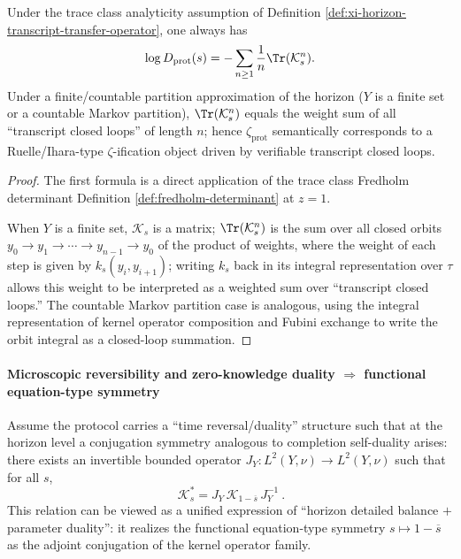 \begin{proposition}\label{prop:xi-horizon-protocol-zeta-loop-expansion}
Under the trace class analyticity assumption of Definition \ref{def:xi-horizon-transcript-transfer-operator}, one always has
\[
\log D_{\mathrm{prot}}(s)=-\sum_{n\ge 1}\frac{1}{n}\Tr(\mathcal{K}_s^{n}).
\]
Under a finite/countable partition approximation of the horizon (\(Y\) is a finite set or a countable Markov partition), \(\Tr(\mathcal{K}_s^{n})\) equals the weight sum of all ``transcript closed loops'' of length \(n\); hence \(\zeta_{\mathrm{prot}}\) semantically corresponds to a Ruelle/Ihara-type \(\zeta\)-ification object driven by verifiable transcript closed loops.
\end{proposition}

\begin{proof}
The first formula is a direct application of the trace class Fredholm determinant Definition \ref{def:fredholm-determinant} at \(z=1\).
\par
When \(Y\) is a finite set, \(\mathcal{K}_s\) is a matrix; \(\Tr(\mathcal{K}_s^{n})\) is the sum over all closed orbits
\(
y_0\to y_1\to\cdots\to y_{n-1}\to y_0
\)
of the product of weights, where the weight of each step is given by \(k_s(y_i,y_{i+1})\); writing \(k_s\) back in its integral representation over \(\tau\) allows this weight to be interpreted as a weighted sum over ``transcript closed loops.''
The countable Markov partition case is analogous, using the integral representation of kernel operator composition and Fubini exchange to write the orbit integral as a closed-loop summation. \qedhere
\end{proof}

\paragraph{Microscopic reversibility and zero-knowledge duality \texorpdfstring{$\Rightarrow$}{=>} functional equation-type symmetry}
Assume the protocol carries a ``time reversal/duality'' structure such that at the horizon level a conjugation symmetry analogous to completion self-duality arises: there exists an invertible bounded operator \(J_Y:L^2(Y,\nu)\to L^2(Y,\nu)\) such that for all \(s\),
\begin{equation}\label{eq:xi-hzom-detailed-balance}
\boxed{\ \mathcal{K}_s^{*}=J_Y\,\mathcal{K}_{1-\overline{s}}\,J_Y^{-1}\ }.
\end{equation}
This relation can be viewed as a unified expression of ``horizon detailed balance \(+\) parameter duality'': it realizes the functional equation-type symmetry \(s\mapsto 1-\overline{s}\) as the adjoint conjugation of the kernel operator family.

